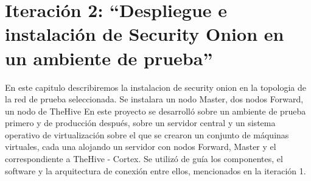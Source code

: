\chapter{Iteración 2: “Despliegue e instalación de Security Onion en un ambiente de prueba”}
    En este capitulo describiremos la instalacion de security onion en la topologia de la red de prueba seleccionada. Se instalara un nodo Master, dos nodos Forward, un nodo de TheHive
    En este proyecto se desarrolló sobre un ambiente de prueba primero y de producción después, sobre un servidor central y un sistema operativo de virtualización sobre el que se crearon un conjunto de máquinas virtuales, cada una alojando un servidor con nodos Forward, Master y el correspondiente a TheHive - Cortex. Se utilizó de guía los componentes, el software y la arquitectura de conexión entre ellos, mencionados en la iteración 1.
    
